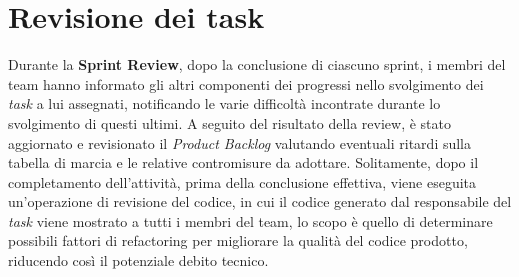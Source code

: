 \section{Revisione dei task}
Durante la \textbf{Sprint Review}, dopo la conclusione di ciascuno sprint, i membri del team hanno informato gli altri componenti dei progressi nello svolgimento dei \textit{task} a lui assegnati, notificando le varie difficolt\`a incontrate durante lo svolgimento di questi ultimi. A seguito del risultato della review, \`e stato aggiornato e revisionato il \textit{Product Backlog} valutando eventuali ritardi sulla tabella di marcia e le relative contromisure da adottare. Solitamente, dopo il completamento dell'attivit\`a, prima della conclusione effettiva, viene eseguita un'operazione di revisione del codice, in cui il codice generato dal responsabile del \textit{task} viene mostrato a tutti i membri del team, lo scopo \`e quello di determinare possibili fattori di refactoring per migliorare la qualit\`a del codice prodotto, riducendo cos\`i il potenziale debito tecnico.

